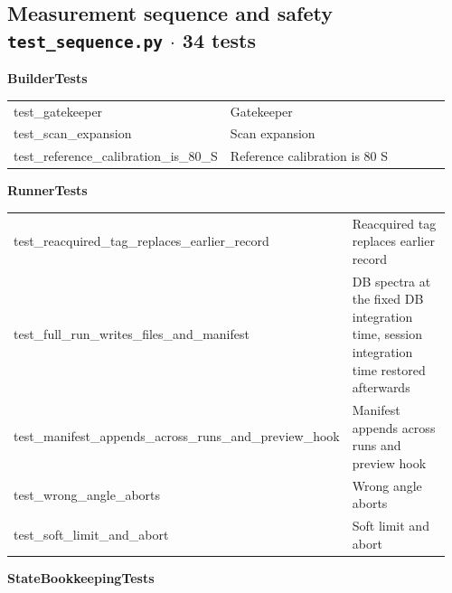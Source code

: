 \subsection{Measurement sequence and safety \hfill \normalfont\small\color{soft2}\texttt{test\_sequence.py} $\cdot$ 34 tests}
\par\smallskip \textbf{BuilderTests}\par\nopagebreak\smallskip
\begin{longtable}{@{}>{\ttfamily\scriptsize\raggedright\arraybackslash}p{0.40\linewidth} >{\footnotesize\raggedright\arraybackslash}p{0.555\linewidth}@{}}
test\_\allowbreak{}gatekeeper & Gatekeeper \\
test\_\allowbreak{}scan\_\allowbreak{}expansion & Scan expansion \\
test\_\allowbreak{}reference\_\allowbreak{}calibration\_\allowbreak{}is\_\allowbreak{}80\_\allowbreak{}S & Reference calibration is 80 S \\
\end{longtable}
\par\smallskip \textbf{RunnerTests}\par\nopagebreak\smallskip
\begin{longtable}{@{}>{\ttfamily\scriptsize\raggedright\arraybackslash}p{0.40\linewidth} >{\footnotesize\raggedright\arraybackslash}p{0.555\linewidth}@{}}
test\_\allowbreak{}reacquired\_\allowbreak{}tag\_\allowbreak{}replaces\_\allowbreak{}earlier\_\allowbreak{}record & Reacquired tag replaces earlier record \\
test\_\allowbreak{}full\_\allowbreak{}run\_\allowbreak{}writes\_\allowbreak{}files\_\allowbreak{}and\_\allowbreak{}manifest & DB spectra at the fixed DB integration time, session integration time restored afterwards \\
test\_\allowbreak{}manifest\_\allowbreak{}appends\_\allowbreak{}across\_\allowbreak{}runs\_\allowbreak{}and\_\allowbreak{}preview\_\allowbreak{}hook & Manifest appends across runs and preview hook \\
test\_\allowbreak{}wrong\_\allowbreak{}angle\_\allowbreak{}aborts & Wrong angle aborts \\
test\_\allowbreak{}soft\_\allowbreak{}limit\_\allowbreak{}and\_\allowbreak{}abort & Soft limit and abort \\
\end{longtable}
\par\smallskip \textbf{StateBookkeepingTests}\par\nopagebreak\smallskip
